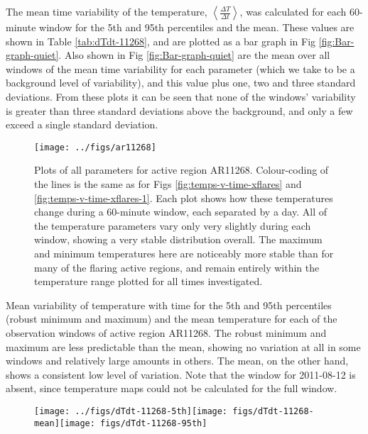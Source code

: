 \documentclass[namedreferences]{solarphysics}
\begin{document}
\begin{article}
The mean time variability of the temperature, $\left\langle \frac{\Delta T}{\Delta t}\right\rangle$, was calculated for each 60-minute window for the 5th and 95th percentiles and the mean.
These values are shown in Table \ref{tab:dTdt-11268}, and are plotted as a bar graph in Fig \ref{fig:Bar-graph-quiet}.
Also shown in Fig \ref{fig:Bar-graph-quiet} are the mean over all windows of the mean time variability for each parameter (which we take to be a background level of variability), and this value plus one, two and three standard deviations.
From these plots it can be seen that none of the windows' variability is greater than three standard deviations above the background, and only a few exceed a single standard deviation.

\begin{figure}
\begin{centering}
\texttt{[image: ../figs/ar11268]} 
\par\end{centering}

\caption{Plots of all parameters for active region AR11268.
Colour-coding of the lines is the same as for Figs \ref{fig:temps-v-time-xflares} and \ref{fig:temps-v-time-xflares-1}. %
Each plot shows how these temperatures change during a 60-minute window, each separated by a day.
All of the temperature parameters vary only very slightly during each window, showing a very stable distribution overall.
The maximum and minimum temperatures here are noticeably more stable than for many of the flaring active regions, and remain entirely within the temperature range plotted for all times investigated.\label{fig:ar11268-allparams}}
\end{figure}

\begin{table}
\caption{Mean variability of temperature with time for the 5th and 95th percentiles (robust minimum and maximum) and the mean temperature for each of the observation windows of active region AR11268.
The robust minimum and maximum are less predictable than the mean, showing no variation at all in some windows and relatively large amounts in others.
The mean, on the other hand, shows a consistent low level of variation.
Note that the window for 2011-08-12 is absent, since temperature maps could not be calculated for the full window.\label{tab:dTdt-11268}}
\centering{}
\end{table}

\begin{figure}
\begin{centering}
\texttt{[image: ../figs/dTdt-11268-5th]}\texttt{[image: figs/dTdt-11268-mean]}\texttt{[image: figs/dTdt-11268-95th]}
\par\end{centering}


\end{figure}
\end{article}
\end{document}
